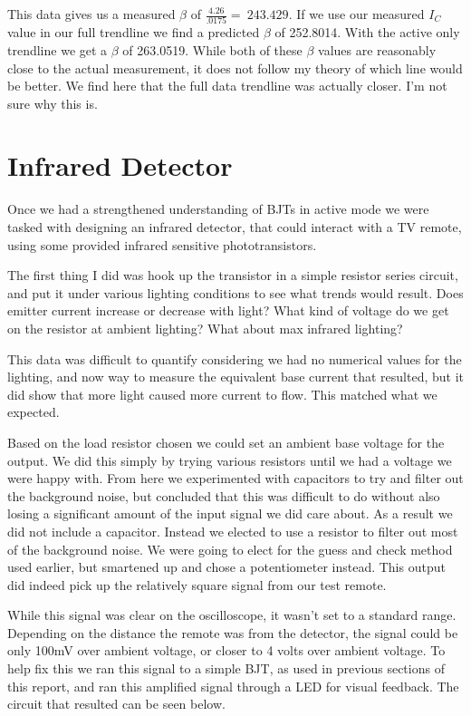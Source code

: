 \documentclass[prb,preprint]{revtex4-1}
\begin{document}
This data gives us a measured $\beta$ of $\frac{4.26}{.0175}=~243.429$. If we use our measured $I_{C}$ value in our full trendline we find a predicted $\beta$ of 252.8014. With the active only trendline we get a $\beta$ of 263.0519. While both of these $\beta$ values are reasonably close to the actual measurement, it does not follow my theory of which line would be better. We find here that the full data trendline was actually closer. I'm not sure why this is.

\section{Infrared Detector}
Once we had a strengthened understanding of BJTs in active mode we were tasked with designing an infrared detector, that could interact with a TV remote, using some provided infrared sensitive phototransistors.

The first thing I did was hook up the transistor in a simple resistor series circuit, and put it under various lighting conditions to see what trends would result. Does emitter current increase or decrease with light? What kind of voltage do we get on the resistor at ambient lighting? What about max infrared lighting?

This data was difficult to quantify considering we had no numerical values for the lighting, and now way to measure the equivalent base current that resulted, but it did show that more light caused more current to flow. This matched what we expected.

Based on the load resistor chosen we could set an ambient base voltage for the output. We did this simply by trying various resistors until we had a voltage we were happy with. From here we experimented with capacitors to try and filter out the background noise, but concluded that this was difficult to do without also losing a significant amount of the input signal we did care about. As a result we did not include a capacitor. Instead we elected to use a resistor to filter out most of the background noise. We were going to elect for the guess and check method used earlier, but smartened up and chose a potentiometer instead. This output did indeed pick up the relatively square signal from our test remote. 

While this signal was clear on the oscilloscope, it wasn't set to a standard range. Depending on the distance the remote was from the detector, the signal could be only 100mV over ambient voltage, or closer to 4 volts over ambient voltage. To help fix this we ran this signal to a simple BJT, as used in previous sections of this report, and ran this amplified signal through a LED for visual feedback. The circuit that resulted can be seen below.
\end{document}

